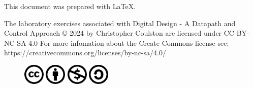 This document was prepared with \LaTeX.
\vspace{2cm}

The laboratory exercises associated with  Digital Design - A Datapath and Control Approach © 2024 by Christopher Coulston are licensed under CC BY-NC-SA 4.0 
For more infomation about the Create Commons license see: https://creativecommons.org/licenses/by-nc-sa/4.0/

\begin{figure}[h]
\includegraphics[width=1cm]{./Fig/cc-logo.pdf}
\includegraphics[width=1cm]{./Fig/cc-by.pdf}
\includegraphics[width=1cm]{./Fig/cc-nc.pdf}
\includegraphics[width=1cm]{./Fig/cc-sa.pdf}
\end{figure}